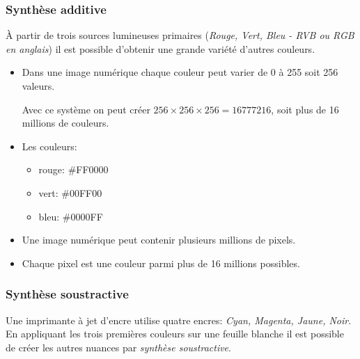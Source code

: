 \documentclass[a4paper,11pt]{article}
\begin{document}
\subsubsection{Synthèse additive}
\begin{aretenir}[]
    À partir de trois sources lumineuses primaires (\emph{Rouge, Vert, Bleu - RVB ou RGB en anglais}) il est possible d'obtenir une grande variété d'autres couleurs.
\end{aretenir}
\begin{itemize}
    \item Dans une image numérique chaque couleur peut varier de 0 à 255 soit 256 valeurs.
          \begin{aretenir}[]
              Avec ce système on peut créer $256×256×256=16777216$, soit plus de 16 millions de couleurs.
          \end{aretenir}
    \item Les couleurs:
          \begin{itemize}
              \item rouge: \#FF0000
              \item vert: \#00FF00
              \item bleu: \#0000FF
          \end{itemize}
\end{itemize}
\begin{aretenir}[]
    \begin{itemize}
        \item Une image numérique peut contenir plusieurs millions de pixels.
        \item Chaque pixel est une couleur parmi plus de 16 millions possibles.
    \end{itemize}
    \end{aretenir}
    \subsubsection{Synthèse soustractive}
    Une imprimante à jet d'encre utilise quatre encres: \emph{Cyan, Magenta, Jaune, Noir}. En appliquant les trois premières couleurs sur une feuille blanche il est possible de créer les autres nuances par \emph{synthèse soustractive}.
\end{document}
